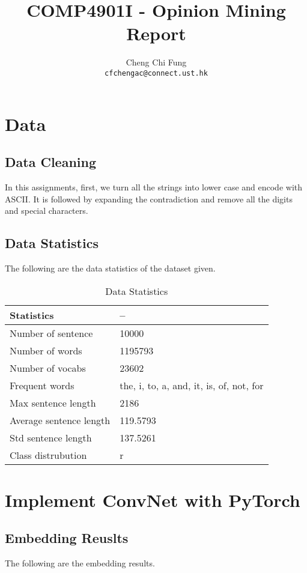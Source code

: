 \documentclass{article}
\title{COMP4901I - Opinion Mining Report}
\author{%
	Cheng Chi Fung \\
	\texttt{cfchengac@connect.ust.hk} \\
}
\begin{document}
\maketitle

\section{Data}

\subsection{Data Cleaning}
In this assignments, first, we turn all the strings into lower case and encode with ASCII. It is followed by expanding the contradiction and remove all the digits and special characters.

\subsection{Data Statistics}
The following are the data statistics of the dataset given.

\begin{table}[htb]
	\caption{Data Statistics}
	\label{sample-table}
	\centering
	\begin{tabular}{ll}
		\toprule
		\cmidrule{1-2}
		Statistics & --  \\
		\midrule
		Number of sentence & 10000 \\
		Number of words & 1195793  \\
		Number of vocabs & 23602 \\
		Frequent words & the, i, to, a, and, it,  is, of, not, for \\
		Max sentence length & 2186  \\
		Average sentence length & 119.5793  \\
		Std sentence length & 137.5261 \\
		Class distrubution & r \\
		\bottomrule
	\end{tabular}
\end{table}

\section{Implement ConvNet with PyTorch}

\subsection{Embedding Reuslts}
The following are the embedding results.
\end{document}
